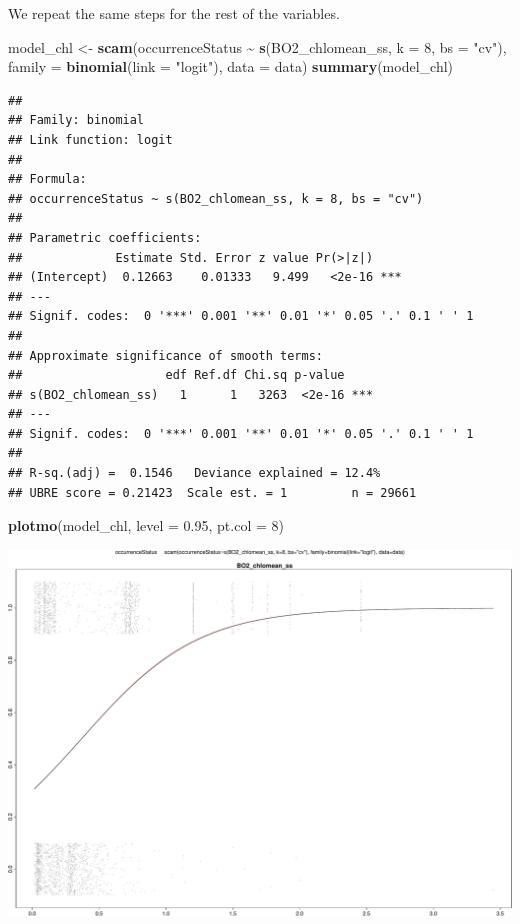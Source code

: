 \documentclass[
]{book}
\newenvironment{Shaded}{\begin{snugshade}}{\end{snugshade}}
\newcommand{\AttributeTok}[1]{\textcolor[rgb]{0.13,0.29,0.53}{#1}}
\newcommand{\DecValTok}[1]{\textcolor[rgb]{0.00,0.00,0.81}{#1}}
\newcommand{\FloatTok}[1]{\textcolor[rgb]{0.00,0.00,0.81}{#1}}
\newcommand{\FunctionTok}[1]{\textcolor[rgb]{0.13,0.29,0.53}{\textbf{#1}}}
\newcommand{\NormalTok}[1]{#1}
\newcommand{\OtherTok}[1]{\textcolor[rgb]{0.56,0.35,0.01}{#1}}
\newcommand{\SpecialCharTok}[1]{\textcolor[rgb]{0.81,0.36,0.00}{\textbf{#1}}}
\newcommand{\StringTok}[1]{\textcolor[rgb]{0.31,0.60,0.02}{#1}}
\begin{document}
We repeat the same steps for the rest of the variables.

\begin{Shaded}
\begin{Highlighting}[]
\NormalTok{model\_chl }\OtherTok{\textless{}{-}} \FunctionTok{scam}\NormalTok{(occurrenceStatus }\SpecialCharTok{\textasciitilde{}} \FunctionTok{s}\NormalTok{(BO2\_chlomean\_ss,}
    \AttributeTok{k =} \DecValTok{8}\NormalTok{, }\AttributeTok{bs =} \StringTok{"cv"}\NormalTok{), }\AttributeTok{family =} \FunctionTok{binomial}\NormalTok{(}\AttributeTok{link =} \StringTok{"logit"}\NormalTok{),}
    \AttributeTok{data =}\NormalTok{ data)}
\FunctionTok{summary}\NormalTok{(model\_chl)}
\end{Highlighting}
\end{Shaded}

\begin{verbatim}
## 
## Family: binomial 
## Link function: logit 
## 
## Formula:
## occurrenceStatus ~ s(BO2_chlomean_ss, k = 8, bs = "cv")
## 
## Parametric coefficients:
##             Estimate Std. Error z value Pr(>|z|)    
## (Intercept)  0.12663    0.01333   9.499   <2e-16 ***
## ---
## Signif. codes:  0 '***' 0.001 '**' 0.01 '*' 0.05 '.' 0.1 ' ' 1
## 
## Approximate significance of smooth terms:
##                    edf Ref.df Chi.sq p-value    
## s(BO2_chlomean_ss)   1      1   3263  <2e-16 ***
## ---
## Signif. codes:  0 '***' 0.001 '**' 0.01 '*' 0.05 '.' 0.1 ' ' 1
## 
## R-sq.(adj) =  0.1546   Deviance explained = 12.4%
## UBRE score = 0.21423  Scale est. = 1         n = 29661
\end{verbatim}

\begin{Shaded}
\begin{Highlighting}[]
\FunctionTok{plotmo}\NormalTok{(model\_chl, }\AttributeTok{level =} \FloatTok{0.95}\NormalTok{, }\AttributeTok{pt.col =} \DecValTok{8}\NormalTok{)}
\end{Highlighting}
\end{Shaded}

\includegraphics{_main_files/figure-latex/unnamed-chunk-62-1.pdf}
\end{document}
